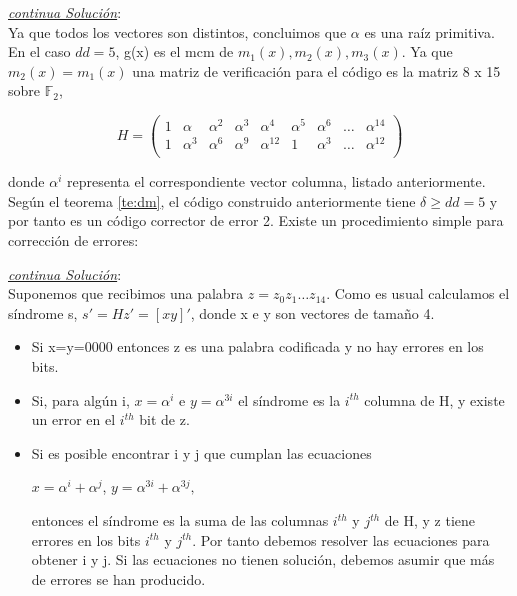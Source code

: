 \begin{frame}  \small  

\textit{\underline{continua Solución}}:\\


Ya que todos los vectores son distintos, concluimos que $\alpha$ es una raíz primitiva. En el caso $dd=5$, g(x) es el mcm de $m_1(x),m_2(x),m_3(x).$ Ya que $m_2(x) =m_1(x)$ una matriz de verificación para el código es la matriz 8 x 15 sobre $\mathbb{F}_2$, 

\[
    H=   \left( \begin{array}{ccccccccc}
     				  1 &  \alpha  & \alpha^2  & \alpha^3 & \alpha^4 & \alpha^5 & \alpha^6  &\ldots & \alpha^{14}\\ 
					  1 &  \alpha^3  & \alpha^6  & \alpha^9 & \alpha^{12} & 1& \alpha^3  &\ldots & \alpha^{12}\\ 
          			\end{array}
    		\right) 	    		
\]

donde $\alpha^ i$ representa el correspondiente vector columna, listado anteriormente.\\
\vspace*{5pt}
Según el teorema \ref{te:dm}, el código construido anteriormente tiene $\delta \geq dd =5$ y por tanto es un código corrector de error 2. Existe un procedimiento simple para corrección de errores:


\end{frame} 
\begin{frame}  \small  
\textit{\underline{continua Solución}}:\\


Suponemos que recibimos una palabra $z= z_0z_1 \ldots z_{14}$. Como es usual calculamos el síndrome s,  $s'= Hz' = [x y]'$, donde x e y son vectores de tamaño 4.

\begin{itemize}
\item Si x=y=0000 entonces z es una palabra codificada y no hay errores en los bits.

\item Si, para algún i, $x=\alpha^i$ e $y=\alpha^{3i}$ el síndrome es la $i^{th}$ columna de H, y existe un error en el $i^{th}$ bit de z.

\item Si es posible encontrar i y j que cumplan las ecuaciones 

\begin{center}
$x=\alpha^i +\alpha^j$, 	$y=\alpha^{3i} +\alpha^{3j},$
\end{center}

entonces el síndrome es la suma de las columnas $i^{th}$ y $j^{th}$ de H, y z tiene errores en los bits $i^{th}$ y $j^{th}$. Por tanto debemos resolver las ecuaciones para obtener i y j. Si las ecuaciones no tienen solución, debemos asumir que más de errores se han producido.
\end{itemize}

\end{frame} 



